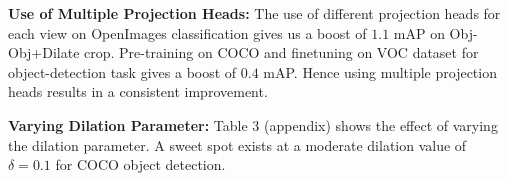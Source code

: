 

\textbf{Use of Multiple Projection Heads:} The use of different projection heads for each view on OpenImages classification gives us a boost of $1.1$ mAP on Obj-Obj+Dilate crop. Pre-training on COCO and finetuning on VOC dataset for object-detection task gives a boost of $0.4$ mAP. Hence using multiple projection heads results in a consistent improvement. 

\textbf{Varying Dilation Parameter:} Table 3 (appendix) shows the effect of varying the dilation parameter. A sweet spot exists at a moderate dilation value of $\delta=0.1$ for COCO object detection. 







